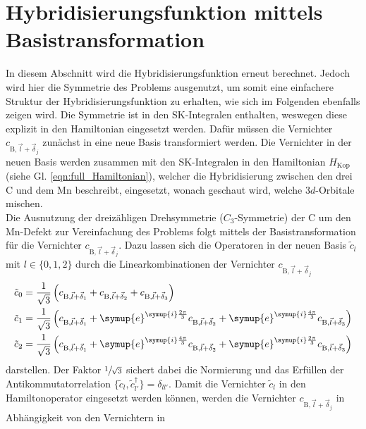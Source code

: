 \section{Hybridisierungsfunktion mittels Basistransformation}
In diesem Abschnitt wird die Hybridisierungsfunktion erneut berechnet. 
Jedoch wird hier die Symmetrie des Problems ausgenutzt, um somit eine einfachere Struktur der Hybridisierungsfunktion zu erhalten, wie sich im 
Folgenden ebenfalls zeigen wird.
Die Symmetrie ist in den SK-Integralen enthalten, weswegen diese explizit in den Hamiltonian eingesetzt werden.
Dafür müssen die Vernichter $c_{\text{B},\vec{l}+\vec{\delta}_j}$ zunächst in eine neue Basis transformiert werden.
Die Vernichter in der neuen Basis werden zusammen mit den SK-Integralen in den Hamiltonian $H_\text{Kop}$ (siehe Gl. \eqref{eqn:full_Hamiltonian}), welcher die Hybridisierung
zwischen den drei C und dem Mn beschreibt, eingesetzt,
wonach geschaut wird, welche $3d$-Orbitale mischen. \\
Die Ausnutzung der dreizähligen Drehsymmetrie ($C_3$-Symmetrie) der C um den Mn-Defekt zur Vereinfachung des Problems folgt mittels der Basistransformation für die Vernichter $c_{\text{B},\vec{l}+\vec{\delta}_j}$.
Dazu lassen sich die Operatoren in der neuen Basis $\tilde{c}_l$ mit $l \in \{0,1,2\}$ durch die Linearkombinationen der Vernichter $c_{\text{B},\vec{l}+\vec{\delta}_j}$
\begin{equation}
    \begin{aligned}
    \tilde{c}_0 &= \frac{1}{\sqrt{3}}\left (c_{\text{B},\vec{l}+\vec{\delta}_1} + c_{\text{B},\vec{l}+\vec{\delta}_2} + c_{\text{B},\vec{l}+\vec{\delta}_3} \right ) \\
    \tilde{c}_1 &= \frac{1}{\sqrt{3}}\left (c_{\text{B},\vec{l}+\vec{\delta}_1}+ \symup{e}^{\symup{i}\frac{2\pi}{3}} c_{\text{B},\vec{l}+\vec{\delta}_2} + \symup{e}^{\symup{i}\frac{4\pi}{3}}c_{\text{B},\vec{l}+\vec{\delta}_3} \right ) \\
    \tilde{c}_2 &= \frac{1}{\sqrt{3}}\left (c_{\text{B},\vec{l}+\vec{\delta}_1} + \symup{e}^{\symup{i}\frac{4\pi}{3}} c_{\text{B},\vec{l}+\vec{\delta}_2} + \symup{e}^{\symup{i}\frac{2\pi}{3}}c_{\text{B},\vec{l}+\vec{\delta}_3} \right ) \label{eqn:sole} 
    \end{aligned}
\end{equation}
darstellen. 
Der Faktor $\sfrac{1}{\sqrt{3}}$ sichert dabei die Normierung und das Erfüllen der Antikommutatorrelation $\{\tilde{c}_l,\tilde{c}^\dagger_{l'}\} = \delta_{ll'}$.
Damit die Vernichter $\tilde{c}_l$ in den Hamiltonoperator eingesetzt werden können, werden die Vernichter $c_{\text{B},\vec{l}+\vec{\delta}_j}$ in Abhängigkeit von den Vernichtern in

